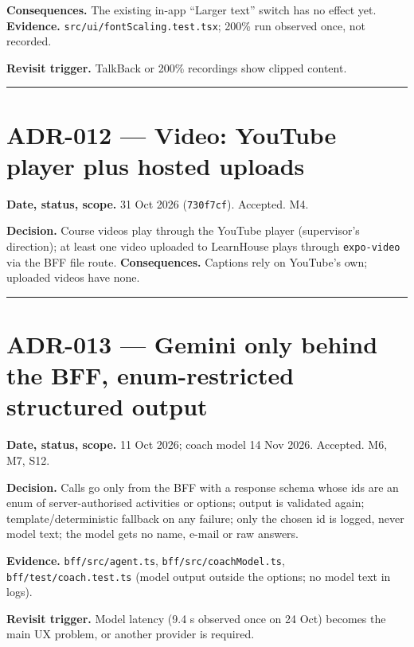 \documentclass[
  11pt,
]{article}
\begin{document}
\textbf{Consequences.} The existing in-app ``Larger text'' switch has no
effect yet. \textbf{Evidence.} \texttt{src/ui/fontScaling.test.tsx};
200\% run observed once, not recorded.

\textbf{Revisit trigger.} TalkBack or 200\% recordings show clipped
content.

\begin{center}\rule{0.5\linewidth}{0.5pt}\end{center}

\hypertarget{adr-012-video-youtube-player-plus-hosted-uploads}{%
\section{ADR-012 --- Video: YouTube player plus hosted
uploads}\label{adr-012-video-youtube-player-plus-hosted-uploads}}

\textbf{Date, status, scope.} 31 Oct 2026 (\texttt{730f7cf}). Accepted.
M4.

\textbf{Decision.} Course videos play through the YouTube player
(supervisor's direction); at least one video uploaded to LearnHouse
plays through \texttt{expo-video} via the BFF file route.
\textbf{Consequences.} Captions rely on YouTube's own; uploaded videos
have none.

\begin{center}\rule{0.5\linewidth}{0.5pt}\end{center}

\hypertarget{adr-013-gemini-only-behind-the-bff-enum-restricted-structured-output}{%
\section{ADR-013 --- Gemini only behind the BFF, enum-restricted
structured
output}\label{adr-013-gemini-only-behind-the-bff-enum-restricted-structured-output}}

\textbf{Date, status, scope.} 11 Oct 2026; coach model 14 Nov 2026.
Accepted. M6, M7, S12.

\textbf{Decision.} Calls go only from the BFF with a response schema
whose ids are an enum of server-authorised activities or options; output
is validated again; template/deterministic fallback on any failure; only
the chosen id is logged, never model text; the model gets no name,
e-mail or raw answers.

\textbf{Evidence.} \texttt{bff/src/agent.ts},
\texttt{bff/src/coachModel.ts}, \texttt{bff/test/coach.test.ts} (model
output outside the options; no model text in logs).

\textbf{Revisit trigger.} Model latency (9.4 s observed once on 24 Oct)
becomes the main UX problem, or another provider is required.
\end{document}
